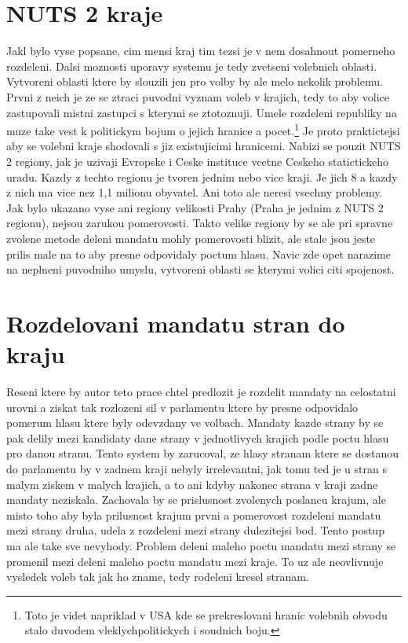 \documentclass[12pt,a4paper]{scrreprt}
\begin{document}
\section{NUTS 2 kraje}
Jakl bylo vyse popsane, cim mensi kraj tim tezsi je v nem dosahnout pomerneho rozdeleni.
Dalsi moznosti uporavy systemu je tedy zvetseni volebnich oblasti.
Vytvoreni oblasti ktere by slouzili jen pro volby by ale melo nekolik problemu.
Prvni z neich je ze se ztraci puvodni vyznam voleb v krajich, tedy to aby volice zastupovali  mistni zastupci s kterymi se ztotoznuji.
Umele rozdeleni republiky na  muze take vest k politickym bojum o jejich hranice a pocet.\footnote{Toto je videt napriklad v USA kde se prekreslovani hranic volebnih obvodu stalo duvodem vleklychpolitickych i soudnich boju.}
Je proto praktictejsi aby se volebni kraje shodovali s jiz existujicimi hranicemi.
Nabizi se pouzit NUTS 2 regiony, jak je uzivaji Evropske i Ceske instituce vcetne Ceskeho statictickeho uradu.
Kazdy z techto regionu je tvoren jednim nebo vice kraji.
Je jich 8 a kazdy z nich ma vice nez 1,1 milionu obyvatel.
Ani toto ale neresi vsechny problemy.
Jak bylo ukazano vyse ani regiony velikosti Prahy (Praha je jednim z NUTS 2 regionu), nejsou zarukou pomerovosti.
Takto velike regiony by se ale pri spravne zvolene metode deleni mandatu mohly pomerovosti blizit, ale stale jsou jeste prilis male na to aby presne odpovidaly poctum hlasu.
Navic zde opet narazime na neplneni puvodniho umyslu, vytvoreni oblasti se kterymi volici citi spojenost.
\section{Rozdelovani mandatu stran do kraju}
Reseni ktere by autor teto prace chtel predlozit je rozdelit mandaty na celostatni urovni a ziskat tak rozlozeni sil v parlamentu ktere by presne odpovidalo pomerum hlasu ktere byly odevzdany ve volbach.
Mandaty kazde strany by se pak delily mezi kandidaty dane strany v jednotlivych krajich podle poctu hlasu pro danou stranu.
Tento system by zarucoval, ze hlasy stranam ktere se dostanou do parlamentu by v zadnem kraji nebyly irrelevantni, jak tomu ted je u stran s malym ziskem v malych krajich, a to ani kdyby nakonec strana v kraji zadne mandaty neziskala. 
Zachovala by se prislusnost zvolenych poslancu krajum, ale misto toho aby byla prilusnost krajum prvni a pomerovost rozdeleni mandatu mezi strany druha, udela z rozdeleni mezi strany dulezitejsi bod.
Tento postup ma ale take sve nevyhody.
Problem deleni maleho poctu mandatu mezi strany se promenil mezi deleni maleho poctu mandatu mezi kraje.
To uz ale neovlivnuje vysledek voleb tak jak ho zname, tedy rodeleni kresel stranam.
\end{document}
